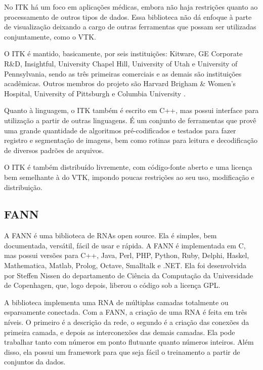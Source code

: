No ITK há um foco em aplicações médicas, embora não haja restrições quanto ao processamento de outros tipos de dados. Essa biblioteca não dá enfoque à parte de visualização deixando a cargo de outras ferramentas que possam ser utilizadas conjuntamente, como o VTK.

O ITK é mantido, basicamente, por seis instituições: Kitware, GE Corporate R\&D, Insightful, University Chapel Hill, University of Utah e University of Pennsylvania, sendo as três primeiras comerciais e as demais são instituições acadêmicas. Outros membros do projeto são Harvard Brigham \& Women's Hospital, University of Pittsburgh e Columbia University \cite{itk-page}.

Quanto à linguagem, o ITK também é escrito em C++, mas possui interface para utilização a partir de outras linguagens. É um conjunto de ferramentas que provê uma grande quantidade de algoritmos pré-codificados e testados para fazer registro e segmentação de imagens, bem como rotinas para leitura e decodificação de diversos padrões de arquivos.

O ITK é também distribuído livremente, com código-fonte aberto e uma licença bem semelhante à do VTK, impondo poucas restrições ao seu uso, modificação e distribuição.


\subsection{FANN}

A FANN é uma biblioteca de RNAs open source. Ela é simples, bem documentada, versátil, fácil de usar e rápida. A FANN é implementada em C, mas possui versões para C++, Java, Perl, PHP, Python, Ruby, Delphi, Haskel, Mathematica, Matlab, Prolog, Octave, Smalltalk e .NET. Ela foi desenvolvida por Steffen Nissen do departamento de Ciência da Computação da Universidade de Copenhagen, que, logo depois, liberou o código sob a licença GPL.

A biblioteca implementa uma RNA de múltiplas camadas totalmente ou esparsamente conectada. Com a FANN, a criação de uma RNA é feita em três níveis. O primeiro é a descrição da rede, o segundo é a criação das conexões da primeira camada, e depois as interconexões das demais camadas. Ela pode trabalhar tanto com números em ponto flutuante quanto números inteiros. Além disso, ela possui um framework para que seja fácil o treinamento a partir de conjuntos da dados.

